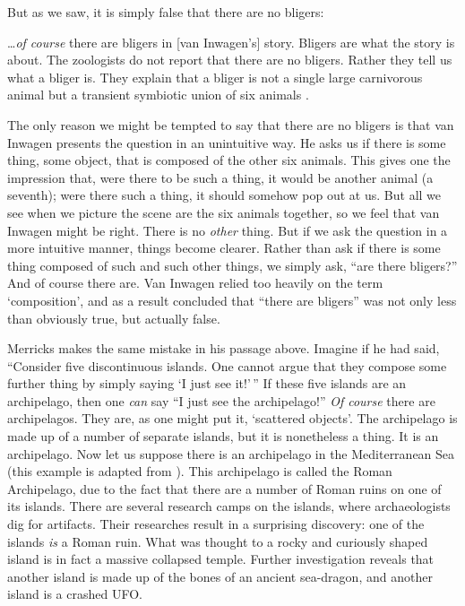 \documentclass[11pt]{article}
\newenvironment{squote}{%
\begin{spacing}{1}
       	\begin{list}{}{%
\setlength{\labelwidth}{0pt}%
\rightmargin\leftmargin%
}
\item\relax
}{%
\end{list}%
\end{spacing}
}
\begin{document}
\begin{spacing}{1.25}
But as we saw, it is simply false that there are no bligers:

\begin{squote}
\ldots {\em of course} there are bligers in [van Inwagen's] story.
Bligers are what the story is about.  The zoologists do not report
that there are no bligers.  Rather they tell us what a bliger is.
They explain that a bliger is not a single large carnivorous animal
but a transient symbiotic union of six animals
\citep[704]{rosenberg1993}.
\end{squote}

The only reason we might be tempted to say that there are no bligers
is that van Inwagen presents the question in an unintuitive way.  He
asks us if there is some thing, some object, that is composed of the
other six animals.  This gives one the impression that, were there to
be such a thing, it would be another animal (a seventh); were there
such a thing, it should somehow pop out at us.  But all we see when we
picture the scene are the six animals together, so we feel that van
Inwagen might be right.  There is no {\em other} thing.  But if we ask
the question in a more intuitive manner, things become clearer.
Rather than ask if there is some thing composed of such and such other
things, we simply ask, ``are there bligers?''  And of course there
are.  Van Inwagen relied too heavily on the term `composition', and as
a result concluded that ``there are bligers'' was not only less than
obviously true, but actually false.

Merricks makes the same mistake in his passage above.  Imagine if he
had said, ``Consider five discontinuous islands.  One cannot argue
that they compose some further thing by simply saying `I just see
it!'\,'' If these five islands are an archipelago, then one {\em can}
say ``I just see the archipelago!''  {\em Of course} there are
archipelagos.  They are, as one might put it, `scattered objects'.
The archipelago is made up of a number of separate islands, but it is
nonetheless a thing.  It is an archipelago.  Now let us suppose there
is an archipelago in the Mediterranean Sea (this example is adapted
from \citet{hawthorne2008}).  This archipelago is called the Roman
Archipelago, due to the fact that there are a number of Roman ruins on
one of its islands.  There are several research camps on the islands,
where archaeologists dig for artifacts.  Their researches result in a
surprising discovery: one of the islands {\em is} a Roman ruin.  What
was thought to a rocky and curiously shaped island is in fact a
massive collapsed temple.  Further investigation reveals that another
island is made up of the bones of an ancient sea-dragon, and another
island is a crashed UFO.


\end{spacing}
\end{document}
